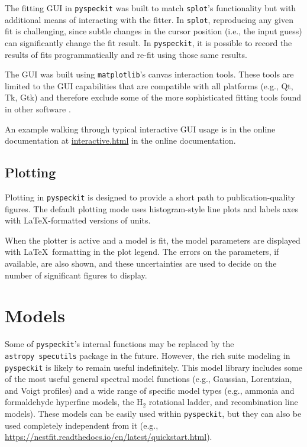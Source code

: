 \documentclass[twocolumn]{aastex63}
\newcommand{\pyspeckit}{\texttt{pyspeckit}\xspace}
\newcommand{\astropy}{\texttt{astropy}\xspace}
\newcommand{\hh}{\ensuremath{\mathrm{H}_2}\xspace}
\begin{document}
The fitting GUI in \texttt{pyspeckit} was built to match \texttt{splot}'s
functionality but with additional means of interacting with the fitter.  In
\texttt{splot}, reproducing any given fit is challenging, since subtle changes
in the cursor position (i.e., the input guess) can significantly change the fit
result.  In \pyspeckit, it is possible to record the results of fits
programmatically and re-fit using those same results.

The GUI was built using \texttt{matplotlib}'s canvas interaction tools.  These
tools are limited to the GUI capabilities that are compatible with all platforms
(e.g., Qt, Tk, Gtk) and therefore exclude some of the more sophisticated fitting
tools found in other software \citep[e.g., \texttt{glue};][]{Beaumont2014b}. 

An example walking through typical interactive GUI usage is in the online
documentation at \url{interactive.html} in the online documentation.

\subsection{Plotting}
Plotting in \pyspeckit is designed to provide a short path to
publication-quality figures.  The default plotting mode uses histogram-style
line plots and labels axes with \LaTeX-formatted versions of units.

When the plotter is active and a model is fit, the model parameters are
displayed with \LaTeX~formatting in the plot legend.  The errors on the
parameters, if available, are also shown, and these uncertainties are used to
decide on the number of significant figures to display.


\section{Models}
\label{sec:models}
Some of \pyspeckit's internal functions may be replaced by the \astropy\
\texttt{specutils} package in the future.  However, the rich suite modeling in
\pyspeckit is likely to remain useful indefinitely.  This model library
includes some of the most useful general spectral model functions (e.g.,
Gaussian, Lorentzian, and Voigt profiles) and a wide range of specific model
types (e.g., ammonia and formaldehyde hyperfine models, the \hh rotational
ladder, and recombination line models).  These models can be easily used
within \pyspeckit, but they can also be used completely independent from
it (e.g., \url{https://nestfit.readthedocs.io/en/latest/quickstart.html}).
\end{document}
